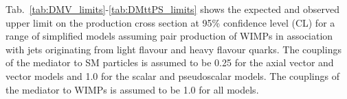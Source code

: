 
Tab.~\ref{tab:DMV_limits}-\ref{tab:DMttPS_limits} shows
the expected and observed upper limit on the
production cross section at 95\% confidence level (CL) for a range of simplified models assuming
pair production of WIMPs in association with jets originating from light flavour and heavy flavour quarks. The couplings of the mediator to SM particles is assumed to be 0.25 for the axial vector and vector models and 1.0 for the scalar and pseudoscalar models. The couplings of the mediator to WIMPs is assumed to be 1.0 for all models. 

